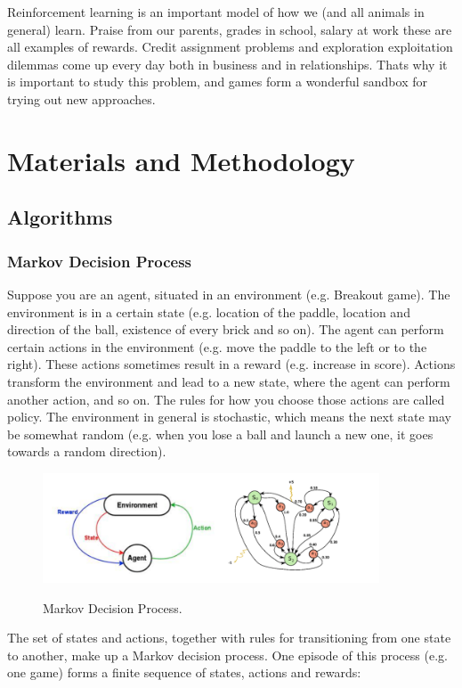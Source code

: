 \documentclass[a4paper,11pt]{article}
\begin{document}
				Reinforcement learning is an important model of how we (and all animals in general) learn. Praise from our parents, grades in school, salary at work these are all examples of rewards. Credit assignment problems and exploration exploitation dilemmas come up every day both in business and in relationships. Thats why it is important to study this problem, and games form a wonderful sandbox for trying out new approaches.

	\section{Materials and Methodology}
		\subsection{Algorithms}
			\subsubsection{Markov Decision Process}
				Suppose you are an agent, situated in an environment (e.g. Breakout game). The environment is in a certain state (e.g. location of the paddle, location and direction of the ball, existence of every brick and so on). The agent can perform certain actions in the environment (e.g. move the paddle to the left or to the right). These actions sometimes result in a reward (e.g. increase in score). Actions transform the environment and lead to a new state, where the agent can perform another action, and so on. The rules for how you choose those actions are called policy. The environment in general is stochastic, which means the next state may be somewhat random (e.g. when you lose a ball and launch a new one, it goes towards a random direction).
				\begin{figure}[!ht]
					\begin{centering}
						\includegraphics[width=10cm]{../Design/images/mdp.png}\\
						\caption{Markov Decision Process.}
					\end{centering}
				\end{figure}
				The set of states and actions, together with rules for transitioning from one state to another, make up a Markov decision process. One episode of this process (e.g. one game) forms a finite sequence of states, actions and rewards:
\end{document}
